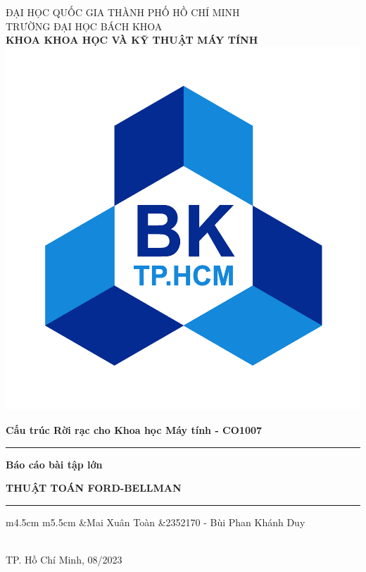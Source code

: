 \documentclass[11pt]{article}
\begin{document}
\thispagestyle{empty} %
\begin{center}
ĐẠI HỌC QUỐC GIA THÀNH PHỐ HỒ CHÍ MINH\\
TRƯỜNG ĐẠI HỌC BÁCH KHOA\\
\textbf{KHOA KHOA HỌC VÀ KỸ THUẬT MÁY TÍNH}\\
\vspace{2.5cm}
\includegraphics[scale=0.09375]{logo}
\vspace{1.5cm}
\end{center}
\textbf{\large Cấu trúc Rời rạc cho Khoa học Máy tính - CO1007}\\
\hrule height 1.25pt \relax
\vspace{0.5cm}
\noindent\textbf{Báo cáo bài tập lớn}
\begin{adjustwidth}{0.2cm}{0.2cm}
    \begin{center}
        \textbf{\LARGE THUẬT TOÁN FORD-BELLMAN}
    \end{center}
\end{adjustwidth}
\vspace{0.25cm}
\hrule height 1.25pt \relax
\vspace{0.5cm}
\begin{center}
    \begin{tabular}{m{4.5cm} m{5.5cm}}
        &Mai Xuân Toàn\cr
        &2352170 - Bùi Phan Khánh Duy\cr
    \end{tabular}\\
    \vspace{\fill}
    TP. Hồ Chí Minh, 08/2023
\end{center}
\newpage

\end{document}
